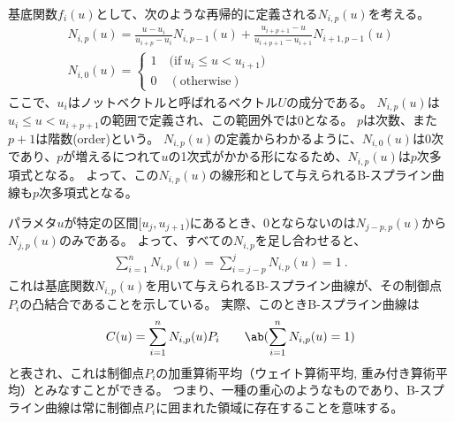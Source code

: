 \clearpage
基底関数$f_i(u)$として、次のような再帰的に定義される$N_{i, p}(u)$を考える。
\begin{gather*}
  N_{i, p}(u)
  = \frac{u-u_i}{u_{i+p}-u_i}N_{i, p-1}(u)
    +\frac{u_{i+p+1}-u}{u_{i+p+1}-u_{i+1}}N_{i+1, p-1}(u)\\
  N_{i, 0}(u)
  = \left\{
    \begin{array}{l}
      1\quad \big(\text{if}~u_i \leq u < u_{i+1}\big)\\
      0\quad (\text{otherwise})
    \end{array}
    \right.
\end{gather*}
ここで、$u_i$はノットベクトルと呼ばれるベクトル$U$の成分である。
$N_{i, p}(u)$は$u_i \leq u < u_{i+p+1}$の範囲で定義され、この範囲外では$0$となる。
$p$は次数、また$p+1$は階数(order)という。
$N_{i, p}(u)$の定義からわかるように、$N_{i, 0}(u)$は0次であり、$p$が増えるにつれて$u$の1次式がかかる形になるため、$N_{i, p}(u)$は$p$次多項式となる。
よって、この$N_{i, p}(u)$の線形和として与えられるB-スプライン曲線も$p$次多項式となる。

パラメタ$u$が特定の区間$[u_j , u_{j+1})$にあるとき、0とならないのは$N_{j-p, p}(u)$から$N_{j, p}(u)$のみである。
よって、すべての$N_{i, p}$を足し合わせると、
\begin{align*}
  \sum_{i=1}^nN_{i, p}(u) = \sum_{i=j-p}^j\!\!N_{i, p}(u) = 1\ .
\end{align*}
これは基底関数$N_{i, p}(u)$を用いて与えられるB-スプライン曲線が、その制御点$P_i$の凸結合であることを示している。
実際、このときB-スプライン曲線は
\begin{align*}
  C(u) = \sum_{i=1}^nN_{i, p}(u)P_i\qquad\ab(\sum_{i=1}^nN_{i, p}(u) =1)
\end{align*}
と表され、これは制御点$P_i$の加重算術平均（ウェイト算術平均, 重み付き算術平均）とみなすことができる。
つまり、一種の重心のようなものであり、B-スプライン曲線は常に制御点$P_i$に囲まれた領域に存在することを意味する。

